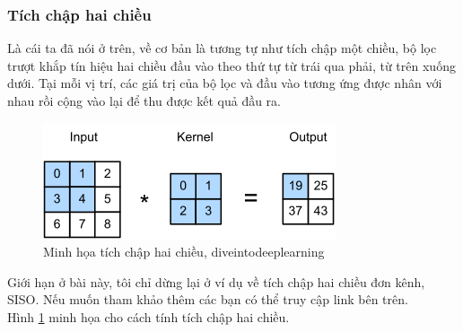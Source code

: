 \documentclass{article}
\begin{document}
            \subsubsection{Tích chập hai chiều}
            Là cái ta đã nói ở trên, về cơ bản là tương tự như tích chập một chiều, bộ lọc trượt khắp tín hiệu hai chiều đầu vào theo thứ tự từ trái qua phải, từ trên xuống dưới. Tại mỗi vị trí, các giá trị của bộ lọc và đầu vào tương ứng được nhân với nhau rồi cộng vào lại để thu được kết quả đầu ra.\\
            \begin{figure}
                \centering
                \includegraphics[width = 0.5\linewidth]{correlation.png}
                \caption{Minh họa tích chập hai chiều, diveintodeeplearning}
                \label{fig3}
            \end{figure}
            Giới hạn ở bài này, tôi chỉ dừng lại ở ví dụ về tích chập hai chiều đơn kênh, SISO. Nếu muốn tham khảo thêm các bạn có thể truy cập link bên trên.\\
            Hình \ref{fig3} minh họa cho cách tính tích chập hai chiều.
\end{document}
